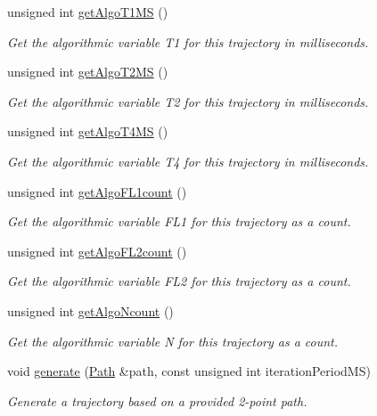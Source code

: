 \begin{DoxyCompactItemize}
unsigned int \hyperlink{classTrajectory_a8aebfcf3c5519b0350e82df8d8a24c5c}{get\-Algo\-T1\-M\-S} ()
\begin{DoxyCompactList}\small\item\em Get the algorithmic variable T1 for this trajectory in milliseconds. \end{DoxyCompactList}\item 
unsigned int \hyperlink{classTrajectory_a21342821f9027d423baa6b9a07828421}{get\-Algo\-T2\-M\-S} ()
\begin{DoxyCompactList}\small\item\em Get the algorithmic variable T2 for this trajectory in milliseconds. \end{DoxyCompactList}\item 
unsigned int \hyperlink{classTrajectory_a61122874889996b7c31cd268b8f45a9a}{get\-Algo\-T4\-M\-S} ()
\begin{DoxyCompactList}\small\item\em Get the algorithmic variable T4 for this trajectory in milliseconds. \end{DoxyCompactList}\item 
unsigned int \hyperlink{classTrajectory_a7db227eff10e1b65c706f9059380af96}{get\-Algo\-F\-L1count} ()
\begin{DoxyCompactList}\small\item\em Get the algorithmic variable F\-L1 for this trajectory as a count. \end{DoxyCompactList}\item 
unsigned int \hyperlink{classTrajectory_ab2406c8e1fbde1523d8ff47bafcfea2b}{get\-Algo\-F\-L2count} ()
\begin{DoxyCompactList}\small\item\em Get the algorithmic variable F\-L2 for this trajectory as a count. \end{DoxyCompactList}\item 
unsigned int \hyperlink{classTrajectory_a818f34c118496aecc5637a672b482d64}{get\-Algo\-Ncount} ()
\begin{DoxyCompactList}\small\item\em Get the algorithmic variable N for this trajectory as a count. \end{DoxyCompactList}\item 
void \hyperlink{classTrajectory_af536bb24d9009ebaa58ec3eb4e415a96}{generate} (\hyperlink{classPath}{Path} \&path, const unsigned int iteration\-Period\-M\-S)
\begin{DoxyCompactList}\small\item\em Generate a trajectory based on a provided 2-\/point path. \end{DoxyCompactList}\item 

\end{DoxyCompactItemize}
